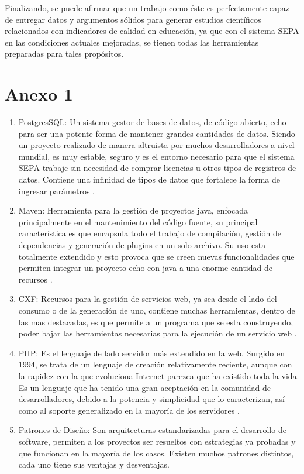 \documentclass[a4paper,12pt,openany,oneside]{book}
\begin{document}
Finalizando, se puede afirmar que un trabajo como éste es perfectamente capaz de entregar datos y argumentos sólidos para generar estudios científicos relacionados con indicadores de calidad en educación, ya que con el sistema SEPA en las condiciones actuales mejoradas, se tienen todas las herramientas preparadas para tales propósitos. 
\chapter{Anexo 1}
\begin{enumerate}
        \item PostgresSQL: Un sistema gestor de bases de datos, de código abierto, echo para ser una potente forma de mantener grandes cantidades de datos. Siendo un proyecto realizado de manera altruista por muchos desarrolladores a nivel mundial, es muy estable, seguro y es el entorno necesario para que el sistema SEPA trabaje sin necesidad de comprar licencias u otros tipos de registros de datos. Contiene una infinidad de tipos de datos que fortalece la forma de ingresar parámetros \cite{data18}.
        \item Maven: Herramienta para la gestión de proyectos java, enfocada principalmente en el mantenimiento del código fuente, su principal característica es que encapsula todo el trabajo de compilación, gestión de dependencias y generación de plugins en un solo archivo. Su uso esta totalmente extendido y esto provoca que se creen nuevas funcionalidades que permiten integrar un proyecto echo con java a una enorme cantidad de recursos \cite{data26}.
        \item CXF: Recursos para la gestión de servicios web, ya sea desde el lado del consumo o de la generación de uno, contiene muchas herramientas, dentro de las mas destacadas, es que permite a un programa que se esta construyendo, poder bajar las herramientas necesarias para la ejecución de un servicio web \cite{data27}.
        \item PHP: Es el lenguaje de lado servidor más extendido en la web. Surgido en 1994, se trata de un lenguaje de creación relativamente reciente, aunque con la rapidez con la que evoluciona Internet parezca que ha existido toda la vida. Es un lenguaje que ha tenido una gran aceptación en la comunidad de desarrolladores, debido a la potencia y simplicidad que lo caracterizan, así como al soporte generalizado en la mayoría de los servidores \cite{data7}.
        \item Patrones de Diseño: Son arquitecturas estandarizadas para el desarrollo de software, permiten a los proyectos ser resueltos con estrategias ya probadas y que funcionan en la mayoría de los casos. Existen muchos patrones distintos, cada uno tiene sus ventajas y desventajas.

\end{enumerate}
\end{document}
